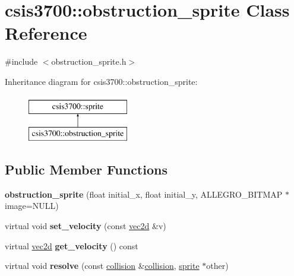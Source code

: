 \hypertarget{classcsis3700_1_1obstruction__sprite}{}\section{csis3700\+:\+:obstruction\+\_\+sprite Class Reference}
\label{classcsis3700_1_1obstruction__sprite}


{\ttfamily \#include $<$obstruction\+\_\+sprite.\+h$>$}

Inheritance diagram for csis3700\+:\+:obstruction\+\_\+sprite\+:\begin{figure}[H]
\begin{center}
\leavevmode
\includegraphics[height=2.000000cm]{classcsis3700_1_1obstruction__sprite}
\end{center}
\end{figure}
\subsection*{Public Member Functions}
\begin{DoxyCompactItemize}
\item 
\mbox{\label{classcsis3700_1_1obstruction__sprite_a9d7f66afeeb3dba404c602b54eeb3308}} 
{\bfseries obstruction\+\_\+sprite} (float initial\+\_\+x, float initial\+\_\+y, A\+L\+L\+E\+G\+R\+O\+\_\+\+B\+I\+T\+M\+AP $\ast$image=N\+U\+LL)
\item 
\mbox{\label{classcsis3700_1_1obstruction__sprite_a6629cd0d13f54ed8666326ca55fb7c0c}} 
virtual void {\bfseries set\+\_\+velocity} (const \hyperlink{classcsis3700_1_1vec2d}{vec2d} \&v)
\item 
\mbox{\label{classcsis3700_1_1obstruction__sprite_aa94cdd034397bd6a30cfe00c15f418ad}} 
virtual \hyperlink{classcsis3700_1_1vec2d}{vec2d} {\bfseries get\+\_\+velocity} () const
\item 
\mbox{\label{classcsis3700_1_1obstruction__sprite_a1ce0b8681cfb6020a332cd97843b4a88}} 
virtual void {\bfseries resolve} (const \hyperlink{classcsis3700_1_1collision}{collision} \&\hyperlink{classcsis3700_1_1collision}{collision}, \hyperlink{classcsis3700_1_1sprite}{sprite} $\ast$other)
\end{DoxyCompactItemize}
